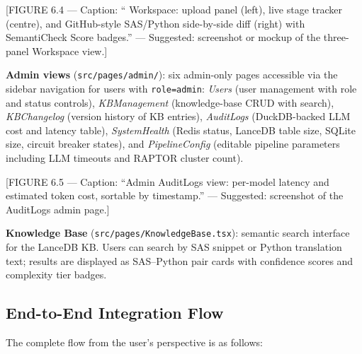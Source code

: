 [FIGURE 6.4 --- Caption: ``\codara{} Workspace: upload panel (left), live
stage tracker (centre), and GitHub-style SAS/Python side-by-side diff (right)
with SemantiCheck Score badges.'' --- Suggested: screenshot or mockup of the
three-panel Workspace view.]

\textbf{Admin views} (\texttt{src/pages/admin/}): six admin-only pages
accessible via the sidebar navigation for users with \texttt{role=admin}:
\textit{Users} (user management with role and status controls),
\textit{KBManagement} (knowledge-base CRUD with search),
\textit{KBChangelog} (version history of KB entries),
\textit{AuditLogs} (DuckDB-backed LLM cost and latency table),
\textit{SystemHealth} (Redis status, LanceDB table size, SQLite size,
circuit breaker states), and \textit{PipelineConfig} (editable pipeline
parameters including LLM timeouts and RAPTOR cluster count).

[FIGURE 6.5 --- Caption: ``Admin AuditLogs view: per-model latency and
estimated token cost, sortable by timestamp.'' --- Suggested: screenshot
of the AuditLogs admin page.]

\textbf{Knowledge Base} (\texttt{src/pages/KnowledgeBase.tsx}): semantic search
interface for the LanceDB KB. Users can search by SAS snippet or Python
translation text; results are displayed as SAS--Python pair cards with
confidence scores and complexity tier badges.

\subsection{End-to-End Integration Flow}
\label{subsec:e2e-integration}

The complete flow from the user's perspective is as follows:


